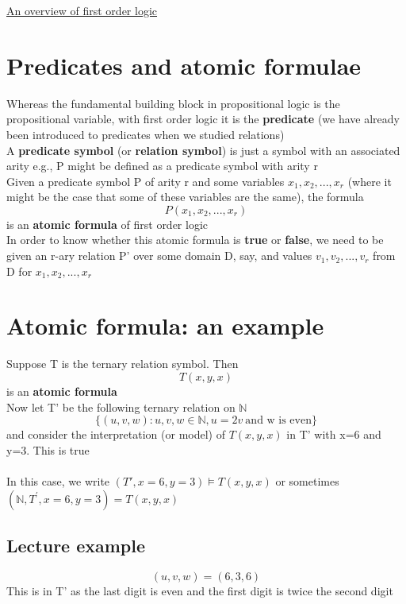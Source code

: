 \documentclass{article}[18pt]
\begin{document}
\begin{center}
\underline{\huge An overview of first order logic}
\end{center}
\section{Predicates and atomic formulae}
Whereas the fundamental building block in propositional logic is the propositional variable, with first order logic it is the \textbf{predicate} (we have already been introduced to predicates when we studied relations)\\
A \textbf{predicate symbol} (or \textbf{relation symbol}) is just a symbol with an associated arity e.g., P might be defined as a predicate symbol with arity r\\
Given a predicate symbol P of arity r and some variables $x_1,x_2,...,x_r$ (where it might be the case that some of these variables are the same), the formula
$$P(x_1,x_2,...,x_r)$$
is an \textbf{atomic formula} of first order logic\\
In order to know whether this atomic formula is \textbf{true} or \textbf{false}, we need to be given an r-ary relation P' over some domain D, say, and values $v_1,v_2,...,v_r$ from D for $x_1,x_2,...,x_r$
\section{Atomic formula: an example}
Suppose T is the ternary relation symbol. Then
$$T(x,y,x)$$
is an \textbf{atomic formula}\\
Now let T' be the following ternary relation on $\mathbb{N}$
$$\{(u,v,w): u,v,w\in \mathbb{N}, u=2v \  \text{and w is even}\}$$
and consider the interpretation (or model) of $T(x,y,x)$ in T' with x=6 and y=3. This is true\\
\\
In this case, we write $(T',x=6,y=3) \models T(x,y,x)$ or sometimes $\left( \mathbb { N } , T ^ { \prime } , x = 6 , y = 3 \right) = T ( x , y , x )$
\subsection{Lecture example}
$$(u,v,w)=(6,3,6)$$
This is in  T' as the last digit is even and the first digit is twice the second digit
\end{document}
